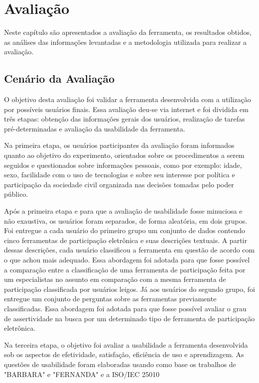 \chapter[Avaliação]{Avaliação}
\label{cap:cap4}

Neste capítulo são apresentados a avaliação da ferramenta, os resultados obtidos, as análises das informações levantadas e a metodologia utilizada para realizar a avaliação. 

\section{Cenário da Avaliação}
\label{sec:cenario}
O objetivo desta avaliação foi validar a ferramenta desenvolvida com a utilização por possíveis usuários finais. Essa avaliação deu-se via internet e foi dividida
em três etapas: obtenção das informações gerais dos usuários, realização de tarefas pré-determinadas e avaliação da usabilidade da ferramenta.


\par
Na primeira etapa, os usuários participantes da avaliação foram informados quanto ao objetivo do experimento, orientados sobre os procedimentos a serem seguidos e questionados 
sobre informações pessoais, como por exemplo: idade, sexo, facilidade com o uso de tecnologias e sobre seu interesse por política e participação da sociedade civil organizada
nas decisões tomadas pelo poder público.

\par
Após a primeira etapa e para que a avaliação de usabilidade fosse minuciosa e não exaustiva, os usuários foram separados, de forma aleatória, em dois grupos.
Foi entregue a cada usuário do primeiro grupo um conjunto de dados contendo cinco ferramentas de participação eletrônica e suas descrições textuais.
A partir dessas descrições, cada usuário classificou a ferramenta em questão de acordo com o que achou mais adequado.
Essa abordagem foi adotada para que fosse possível a comparação entre a classificação de uma ferramenta de participação feita por um especialistas no assunto em comparação com
a mesma ferramenta de participação classificada por usuários leigos.
Já aos usuários do segundo grupo, foi entregue um conjunto de perguntas sobre as ferramentas previamente classificadas. Essa abordagem foi adotada para que fosse possível avaliar
o grau de assertividade na busca por um determinado tipo de ferramenta de participação eletrônica.

\par
Na terceira etapa, o objetivo foi avaliar a usabilidade a ferramenta desenvolvida sob os aspectos de efetividade, satisfação, eficiência de uso e aprendizagem. 
As questões de usabilidade foram elaboradas usando como base os trabalhos de "BARBARA" e "FERNANDA" e a ISO/IEC 25010